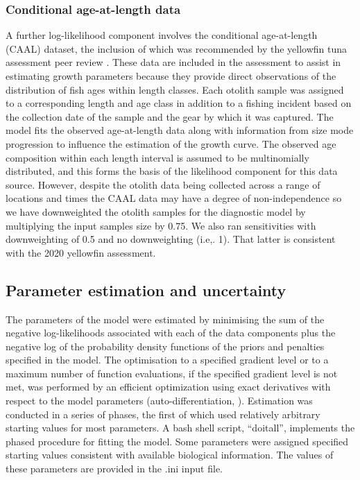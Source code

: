 \subsubsection{Conditional age-at-length data}
\label{sec:CAAL_likelihood}

A further log-likelihood component involves the conditional age-at-length (CAAL) dataset, the inclusion of which was recommended by the yellowfin tuna assessment peer review \citep{punt_independent_2023}. These data are included in the assessment to assist in estimating growth parameters because they provide direct observations of the distribution of fish ages within length classes. Each otolith sample was assigned to a corresponding length and age class in addition to a fishing incident based on the collection date of the sample and the gear by which it was captured. The model fits the observed age-at-length data along with information from size mode progression to influence the estimation of the growth curve. The observed age composition within each length interval is assumed to be multinomially distributed, and this forms the basis of the likelihood component for this data source. However, despite the otolith data being collected across a range of locations and times the CAAL data may have a degree of non-independence so we have downweighted the otolith samples for the diagnostic model by multiplying the input samples size by 0.75. We also ran sensitivities with downweighting of 0.5 and no downweighting (i.e,. 1). That latter is consistent with the 2020 yellowfin assessment.

\subsection{Parameter estimation and uncertainty}
\label{sec:parameter_uncertainty}

The parameters of the model were estimated by minimising the sum of the negative log-likelihoods associated with each of the data components plus the negative log of the probability density functions of the priors and penalties specified in the model. The optimisation to a specified gradient level or to a maximum number of function evaluations, if the specified gradient level is not met, was performed by an efficient optimization using exact derivatives with respect to the model parameters (auto-differentiation, \citet{fournier_ad_2012}). Estimation was conducted in a series of phases, the first of which used relatively arbitrary starting values for most parameters. A bash shell script, ``doitall'', implements the phased procedure for fitting the model. Some parameters were assigned specified starting values consistent with available biological information. The values of these parameters are provided in the .ini input file.

